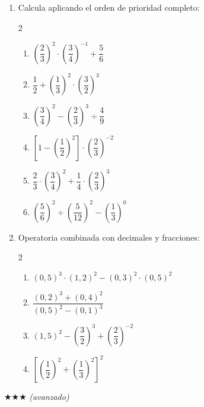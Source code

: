 \documentclass[11pt, letterpaper]{article}
\begin{document}
\begin{enumerate}[label=\textbf{\arabic*.}, leftmargin=*, resume]
  \item Calcula aplicando el orden de prioridad completo:
  \begin{multicols}{2}
  \begin{enumerate}[label=\alph*)]
    \item $\left(\dfrac{2}{3}\right)^2\cdot\left(\dfrac{3}{4}\right)^{-1}+\dfrac{5}{6}$
    \item $\dfrac{1}{2}+\left(\dfrac{1}{3}\right)^2\cdot\left(\dfrac{3}{2}\right)^3$
    \item $\left(\dfrac{3}{4}\right)^2-\left(\dfrac{2}{3}\right)^3 \div \dfrac{4}{9}$
    \item $\left[1-\left(\dfrac{1}{2}\right)^2\right]\cdot\left(\dfrac{2}{3}\right)^{-2}$
    \item $\dfrac{2}{3}\cdot\left(\dfrac{3}{4}\right)^2+\dfrac{1}{4}\cdot\left(\dfrac{2}{3}\right)^3$
    \item $\left(\dfrac{5}{6}\right)^2 \div \left(\dfrac{5}{12}\right)^2-\left(\dfrac{1}{3}\right)^0$
  \end{enumerate}
  \end{multicols}

  \item Operatoria combinada con decimales y fracciones:
  \begin{multicols}{2}
  \begin{enumerate}[label=\alph*)]
    \item $(0{,}5)^3\cdot(1{,}2)^2-(0{,}3)^2\cdot(0{,}5)^2$
    \item $\dfrac{(0{,}2)^3+(0{,}4)^2}{(0{,}5)^2-(0{,}1)^3}$
    \item $(1{,}5)^2-\left(\dfrac{3}{2}\right)^3+\left(\dfrac{2}{3}\right)^{-2}$
    \item $\left[\left(\dfrac{1}{2}\right)^2+\left(\dfrac{1}{3}\right)^2\right]^2$
  \end{enumerate}
  \end{multicols}
\end{enumerate}

$\bigstar\bigstar\bigstar$ \textit{(avanzado)}
\end{document}
